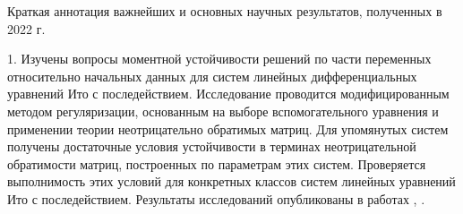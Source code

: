 

% 

Краткая аннотация важнейших и основных научных результатов,
полученных в 2022 г.
\smallskip

1. Изучены вопросы моментной устойчивости решений по части
переменных относительно начальных данных для систем линейных
дифференциальных уравнений Ито с последействием. Исследование
проводится модифицированным методом регуляризации, основанным на
выборе вспомогательного уравнения и применении теории неотрицательно
обратимых матриц. Для упомянутых систем получены достаточные условия
устойчивости в терминах неотрицательной обратимости матриц,
построенных по параметрам этих систем. Проверяется выполнимость этих
условий для конкретных классов систем линейных уравнений Ито с
последействием. Результаты исследований опубликованы в работах \cite{bib:kad-1},
\cite{bib:kad-2}.
\smallskip

